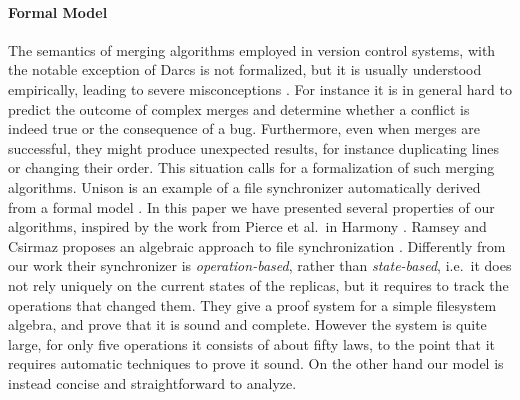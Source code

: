\documentclass{sigplanconf}
\theoremstyle{plain}
\begin{document}
\paragraph{Formal Model}
The semantics of merging algorithms employed in version control
systems, with the notable exception of Darcs \cite{HomoPatchTheory,
  CategoryPatchTheory} is not formalized, but it is usually understood
empirically, leading to severe misconceptions \cite{PierceDiff3}.
%
For instance it is in general hard to predict the outcome of complex
merges and determine whether a conflict is indeed true or the
consequence of a bug.
%
Furthermore, even when merges are successful, they might produce
unexpected results, for instance duplicating lines or changing their
order.
%
This situation calls for a formalization of such merging algorithms.
%
Unison \cite{UnisonSpec} is an example of a file synchronizer
automatically derived from a formal model \cite{Pierce98}.
%
In this paper we have presented several properties of our algorithms,
inspired by the work from Pierce et al.\ in Harmony
\cite{HarmonyOverview}.
%
Ramsey and Csirmaz proposes an algebraic approach to file
synchronization \cite{Ramsey01}. 
%
Differently from our work their synchronizer is
\emph{operation-based}, rather than \emph{state-based}, i.e.\ it does
not rely uniquely on the current states of the replicas, but it
requires to track the operations that changed them.
%
They give a proof system for a simple filesystem algebra,
and prove that it is sound and complete.
%
%
However the system is quite large, for only five operations it
consists of about fifty laws, to the point that it requires automatic
techniques to prove it sound.
%
On the other hand our model is instead concise and straightforward
to analyze.
%
\end{document}
